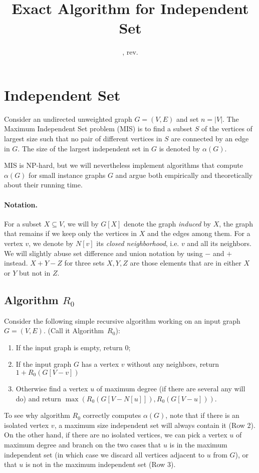 \documentclass{tufte-handout}
\title{\sf Exact Algorithm for Independent Set}
\date{\GITAuthorDate, rev. \GITAbrHash}
\author{}
\begin{document}
\maketitle

\section{Independent Set}
Consider an undirected unweighted graph $G=(V,E)$ and set $n=|V|$.
The Maximum Independent Set problem (MIS) is to find a subset $S$ of
the vertices of largest size such that no pair of different vertices
in $S$ are connected by an edge in $G$.
The size of the largest independent set in $G$ is denoted by
$\alpha(G)$.

MIS is NP-hard, but we will nevertheless implement algorithms that
compute $\alpha(G)$ for small instance graphs $G$ and argue both
empirically and theoretically about their running time.

\paragraph{Notation.}
For a subset $X\subseteq V$, we will by $G[X]$ denote the graph
\emph{induced} by $X$, the graph that remains if we keep only the
vertices in $X$ and the edges among them.
For a vertex $v$, we denote by $N[v]$ its \emph{closed neighborhood},
i.e. $v$ and all its neighbors.
We will slightly abuse set difference and union notation by using $-$
and $+$ instead.
$X+Y-Z$ for three sets $X,Y,Z$ are those elements that are in either
$X$ or $Y$ but not in $Z$.


\subsection{Algorithm $R_0$}

Consider the following simple recursive algorithm working on an input
graph $G=(V,E)$.
(Call it Algorithm~$R_0$):
\begin{enumerate}
\item
If the input graph is empty, return $0$;
\item
If the input graph $G$ has a vertex $v$ without any neighbors, return $1+R_0(G[V-v])$
\item
Otherwise find a vertex $u$ of maximum degree (if there are several
any will do) and return $\max(R_0(G[V-N[u]]), 
R_0(G[V-u]))$.
\end{enumerate}

To see why algorithm $R_0$ correctly computes $\alpha(G)$, note that
if there is an isolated vertex $v$, a maximum size independent set
will always contain it (Row 2).
On the other hand, if there are no isolated vertices, we can pick a
vertex $u$ of maximum degree and branch on the two cases that $u$ is
in the maximum independent set (in which case we discard all vertices
adjacent to $u$ from $G$), or that $u$ is not in the maximum
independent set (Row 3).
\end{document}
